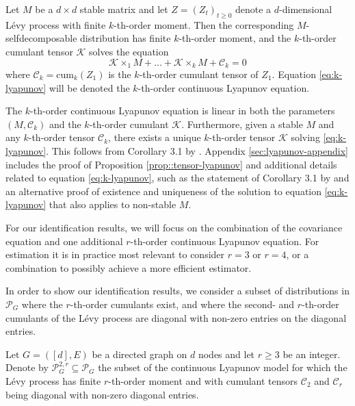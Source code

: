 \documentclass{biometrika}
\begin{document}
\begin{proposition} \label{prop::tensor-lyapunov} Let $M$ be a $d \times d$ stable matrix
and let $Z = (Z_t)_{t \geq 0}$ denote a $d$-dimensional Lévy process with 
finite $k$-th-order moment. Then the corresponding $M$-selfdecomposable distribution 
has finite $k$-th-order moment, and the $k$-th-order cumulant tensor $\mathcal{K}$ solves the equation 
\begin{equation} \label{eq:k-lyapunov}
    \mathcal{K} \times_1 M + \ldots + \mathcal{K}  \times_k M + \mathcal{C}_k = 0
\end{equation}
where $\mathcal{C}_k = \mathrm{cum}_k(Z_1)$ is the $k$-th-order cumulant tensor of $Z_1$. Equation \eqref{eq:k-lyapunov} will be denoted the $k$-th-order continuous Lyapunov equation. 
\end{proposition}
The $k$-th-order continuous Lyapunov equation is linear in both the parameters $(M, \mathcal{C}_k)$ and
the $k$-th-order cumulant $\mathcal{K}$. Furthermore, given a stable $M$ and any $k$-th-order tensor $\mathcal{C}_{k}$, there exists a unique $k$-th-order tensor $\mathcal{K} $ solving \eqref{eq:k-lyapunov}. This follows from Corollary 3.1 by \cite{Xu:2021}. Appendix \ref{sec:lyapunov-appendix} includes
the proof of Proposition \ref{prop::tensor-lyapunov} and additional details
related to equation \eqref{eq:k-lyapunov}, such as the statement of Corollary 3.1 by \cite{Xu:2021} and an alternative proof of existence and uniqueness of the solution to equation \eqref{eq:k-lyapunov} that also applies to non-stable $M$. 




For our identification results, we will focus on the combination of the covariance equation and one additional $r$-th-order continuous Lyapunov equation.
For estimation it is in practice most relevant to consider $r = 3$ or $r = 4$, or a combination to possibly achieve a more efficient estimator.



In order to show our identification results, we consider a subset of 
distributions in $\mathcal{P}_G$ where the $r$-th-order cumulants exist,
and where the second- and $r$-th-order cumulants of the Lévy process are diagonal with 
non-zero entries on the diagonal entries.

\begin{definition}
\label{dfn:P2rG}
Let $G = ([d], E)$ be a directed graph on $d$ nodes and let $r \geq 3$ be an integer. Denote by 
$\mathcal{P}^{2, r}_{G} \subseteq \mathcal{P}_G$ the subset of the continuous Lyapunov model 
for which the Lévy process has finite $r$-th-order moment and with cumulant tensors $\mathcal{C}_2$
and $\mathcal{C}_r$ being diagonal with non-zero diagonal entries.
\end{definition}
\end{document}
